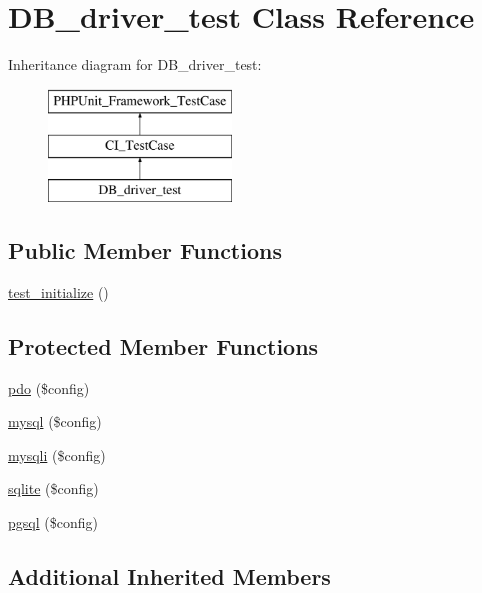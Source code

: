 \hypertarget{class_d_b__driver__test}{}\section{D\+B\+\_\+driver\+\_\+test Class Reference}
\label{class_d_b__driver__test}
Inheritance diagram for D\+B\+\_\+driver\+\_\+test\+:\begin{figure}[H]
\begin{center}
\leavevmode
\includegraphics[height=3.000000cm]{class_d_b__driver__test}
\end{center}
\end{figure}
\subsection*{Public Member Functions}
\begin{DoxyCompactItemize}
\item 
\hyperlink{class_d_b__driver__test_abaff3af863ef017b0a78529dbf91e450}{test\+\_\+initialize} ()
\end{DoxyCompactItemize}
\subsection*{Protected Member Functions}
\begin{DoxyCompactItemize}
\item 
\hyperlink{class_d_b__driver__test_ad29dde2d894d1489880eb2685392b008}{pdo} (\$config)
\item 
\hyperlink{class_d_b__driver__test_a7eb2622bec1a3864a99abea71e2c327f}{mysql} (\$config)
\item 
\hyperlink{class_d_b__driver__test_a256c6250f321db0209befc29bce6df0f}{mysqli} (\$config)
\item 
\hyperlink{class_d_b__driver__test_a07ce9930fccd0fffe1c6f1a92ac924dc}{sqlite} (\$config)
\item 
\hyperlink{class_d_b__driver__test_a02a6f6c5d21a1cb6c8e2e459987ef05f}{pgsql} (\$config)
\end{DoxyCompactItemize}
\subsection*{Additional Inherited Members}


